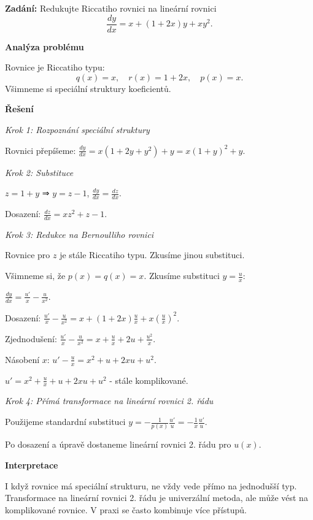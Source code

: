 \begin{example}
\label{ex:b2-lehky-redukce-linearni}

\noindent\textbf{Zadání:} Redukujte Riccatiho rovnici na lineární rovnici
\[
\frac{dy}{dx} = x + (1 + 2x)y + xy^2.
\]

\vspace{1.5\baselineskip}

\noindent\textbf{Analýza problému}

\noindent Rovnice je Riccatiho typu:
\[
q(x) = x, \quad r(x) = 1 + 2x, \quad p(x) = x.
\]
Všimneme si speciální struktury koeficientů.

\vspace{1.5\baselineskip}

\noindent\textbf{Řešení}

\noindent\textit{Krok 1: Rozpoznání speciální struktury}

Rovnici přepíšeme: $\frac{dy}{dx} = x(1 + 2y + y^2) + y = x(1 + y)^2 + y$.

\noindent\textit{Krok 2: Substituce}

$z = 1 + y$ ⇒ $y = z - 1$, $\frac{dy}{dx} = \frac{dz}{dx}$.

Dosazení: $\frac{dz}{dx} = xz^2 + z - 1$.

\noindent\textit{Krok 3: Redukce na Bernoulliho rovnici}

Rovnice pro $z$ je stále Riccatiho typu. Zkusíme jinou substituci.

Všimneme si, že $p(x) = q(x) = x$. Zkusíme substituci $y = \frac{u}{x}$:

$\frac{dy}{dx} = \frac{u'}{x} - \frac{u}{x^2}$.

Dosazení: $\frac{u'}{x} - \frac{u}{x^2} = x + (1 + 2x)\frac{u}{x} + x\left(\frac{u}{x}\right)^2$.

Zjednodušení: $\frac{u'}{x} - \frac{u}{x^2} = x + \frac{u}{x} + 2u + \frac{u^2}{x}$.

Násobení $x$: $u' - \frac{u}{x} = x^2 + u + 2xu + u^2$.

$u' = x^2 + \frac{u}{x} + u + 2xu + u^2$ - stále komplikované.

\noindent\textit{Krok 4: Přímá transformace na lineární rovnici 2. řádu}

Použijeme standardní substituci $y = -\frac{1}{p(x)}\frac{u'}{u} = -\frac{1}{x}\frac{u'}{u}$.

Po dosazení a úpravě dostaneme lineární rovnici 2. řádu pro $u(x)$.

\vspace{1.5\baselineskip}

\noindent\textbf{Interpretace}

I když rovnice má speciální strukturu, ne vždy vede přímo na jednodušší typ. 
Transformace na lineární rovnici 2. řádu je univerzální metoda, ale může 
vést na komplikované rovnice. V praxi se často kombinuje více přístupů.

\end{example}

